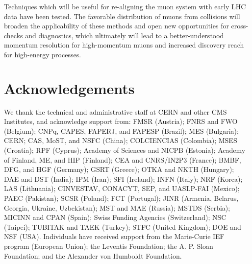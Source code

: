Techniques which will be useful for re-aligning
the muon system with early LHC data have been tested.  The favorable distribution of
muons from collisions will broaden the applicability of these methods
and open new opportunities for cross-checks and diagnostics, which
ultimately will lead to a better-understood momentum resolution for
high-momentum muons and increased discovery reach for high-energy
processes.

\section*{Acknowledgements}

We thank the technical and administrative staff at CERN and other CMS
Institutes, and acknowledge support from: FMSR (Austria); FNRS and FWO
(Belgium); CNPq, CAPES, FAPERJ, and FAPESP (Brazil); MES (Bulgaria);
CERN; CAS, MoST, and NSFC (China); COLCIENCIAS (Colombia); MSES
(Croatia); RPF (Cyprus); Academy of Sciences and NICPB (Estonia);
Academy of Finland, ME, and HIP (Finland); CEA and CNRS/IN2P3
(France); BMBF, DFG, and HGF (Germany); GSRT (Greece); OTKA and NKTH
(Hungary); DAE and DST (India); IPM (Iran); SFI (Ireland); INFN
(Italy); NRF (Korea); LAS (Lithuania); CINVESTAV, CONACYT, SEP, and
UASLP-FAI (Mexico); PAEC (Pakistan); SCSR (Poland); FCT (Portugal);
JINR (Armenia, Belarus, Georgia, Ukraine, Uzbekistan); MST and MAE
(Russia); MSTDS (Serbia); MICINN and CPAN (Spain); Swiss Funding
Agencies (Switzerland); NSC (Taipei); TUBITAK and TAEK (Turkey); STFC
(United Kingdom); DOE and NSF (USA). Individuals have received support
from the Marie-Curie IEF program (European Union); the Leventis
Foundation; the A. P. Sloan Foundation; and the Alexander von Humboldt
Foundation.


